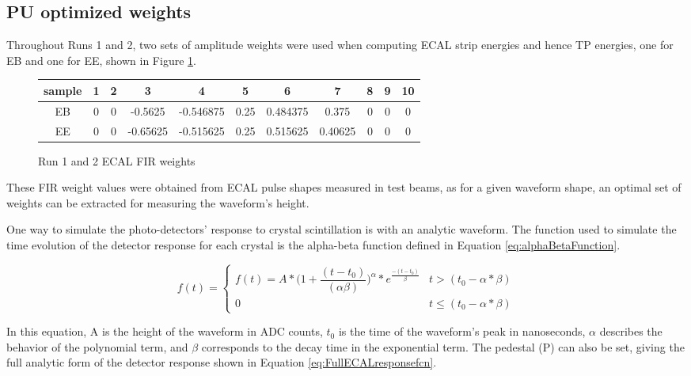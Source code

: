 \subsection{PU optimized weights} \label{sec:PU_Optimized_Weights}

Throughout Runs 1 and 2, two sets of amplitude weights were used when computing ECAL strip energies and hence TP energies, one for EB and one for EE, shown in Figure \ref{fig:ECAL_weights}.

\begin{figure}[H]
\begin{center}
\begin{tabular}{ccccccccccc} \toprule

sample & 1 & 2 & 3 & 4 & 5 & 6 & 7 & 8 & 9 & 10 \\ \midrule
EB & 0 & 0 & -0.5625 & -0.546875 & 0.25 & 0.484375 & 0.375 & 0 & 0 & 0 \\ EE & 0 & 0 & -0.65625 & -0.515625 & 0.25 & 0.515625 & 0.40625 & 0 & 0 & 0 \\ \bottomrule

\end{tabular} 
\end{center}
\caption{Run 1 and 2 ECAL FIR weights} %
\label{fig:ECAL_weights}
\end{figure}

These FIR weight values were obtained from ECAL pulse shapes measured in test beams, as for a given waveform shape, an optimal set of weights can be extracted for measuring the waveform's height.

One way to simulate the photo-detectors' response to crystal scintillation is with an analytic waveform. The function used to simulate the time evolution of the detector response for each crystal is the alpha-beta function defined in Equation \ref{eq:alphaBetaFunction}. 

\begin{equation} \label{eq:alphaBetaFunction}
	f(t) = 	
	\begin{cases} 
      f(t) = A*\Bigg(1 + \dfrac{(t - t_{0})}{(\alpha\beta)}\Bigg)^{\alpha}*e^{\frac{-(t-t_{0})}{\beta}} & t > (t_{0} - \alpha*\beta) \\
     0 & t \leq (t_{0} -\alpha*\beta)
  \end{cases}
\end{equation}

In this equation, A is the height of the waveform in ADC counts, $t_{0}$ is the time of the waveform's peak in nanoseconds, $\alpha$ describes the behavior of the polynomial term, and $\beta$ corresponds to the decay time in the exponential term. The pedestal (P) can also be set, giving the full analytic form of the detector response shown in Equation \ref{eq:FullECALresponsefcn}.


